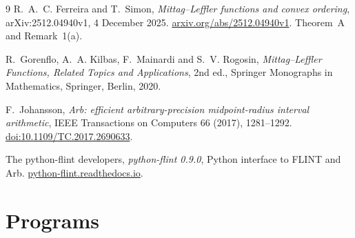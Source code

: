 \documentclass[11pt,a4paper]{article}
\theoremstyle{plain}
\theoremstyle{remark}
\begin{document}
\begin{thebibliography}{9}
R.~A.~C. Ferreira and T.~Simon, \emph{Mittag--Leffler functions and convex ordering},
arXiv:2512.04940v1, 4 December 2025.
\href{https://arxiv.org/abs/2512.04940v1}{arxiv.org/abs/2512.04940v1}.
Theorem~A and Remark~1(a).

R.~Gorenflo, A.~A. Kilbas, F.~Mainardi and S.~V. Rogosin,
\emph{Mittag--Leffler Functions, Related Topics and Applications}, 2nd ed.,
Springer Monographs in Mathematics, Springer, Berlin, 2020.

F.~Johansson, \emph{Arb: efficient arbitrary-precision midpoint-radius interval arithmetic},
IEEE Transactions on Computers 66 (2017), 1281--1292.
\href{https://doi.org/10.1109/TC.2017.2690633}{doi:10.1109/TC.2017.2690633}.

The python-flint developers, \emph{python-flint 0.9.0}, Python interface to FLINT and Arb.
\href{https://python-flint.readthedocs.io/}{python-flint.readthedocs.io}.
\end{thebibliography}

\appendix
\section{Programs}\label{app:code}
\end{document}
